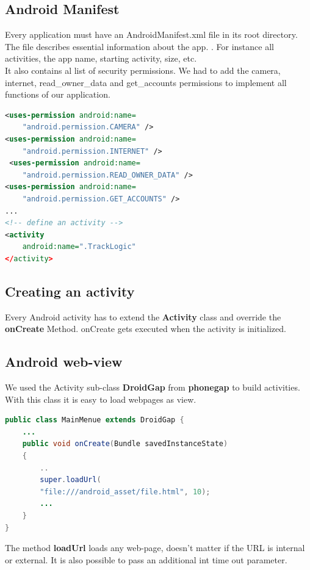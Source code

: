 \subsection{Android Manifest}
Every application must have an AndroidManifest.xml file in its root directory. The file describes essential information about the app. \cite{androidManifest}. For instance all activities, the app name, starting activity, size, etc. 
\\

It also contains al list of security permissions. We had to add the camera, internet, read\_owner\_data and get\_accounts permissions to implement all functions of our application. 


\begin{lstlisting}[language=xml, caption= 
extracts from our AndroidManifest]
<uses-permission android:name=
	"android.permission.CAMERA" />
<uses-permission android:name=
	"android.permission.INTERNET" />
 <uses-permission android:name=
 	"android.permission.READ_OWNER_DATA" />
<uses-permission android:name=
	"android.permission.GET_ACCOUNTS" /> 
...
<!-- define an activity -->
<activity
	android:name=".TrackLogic"          
</activity>
\end{lstlisting}

\subsection{Creating an activity}
Every Android activity has to extend the \textbf{Activity} class and override the \textbf{onCreate} Method. onCreate gets executed when the activity is initialized.

\subsection{Android web-view}
We used the Activity sub-class \textbf{DroidGap} from \textbf{phonegap} to build activities. With this class it is easy to load webpages as view. 
\\



\begin{lstlisting}[language=java, caption= 
extracts from our source code]
public class MainMenue extends DroidGap {
	...
	public void onCreate(Bundle savedInstanceState)
	{
		..
		super.loadUrl(
		"file:///android_asset/file.html", 10);
		...
	}
}
\end{lstlisting}

The method \textbf{loadUrl} loads any web-page, doesn't matter if the URL is internal or external. It is also possible to pass an additional int time out parameter.   


